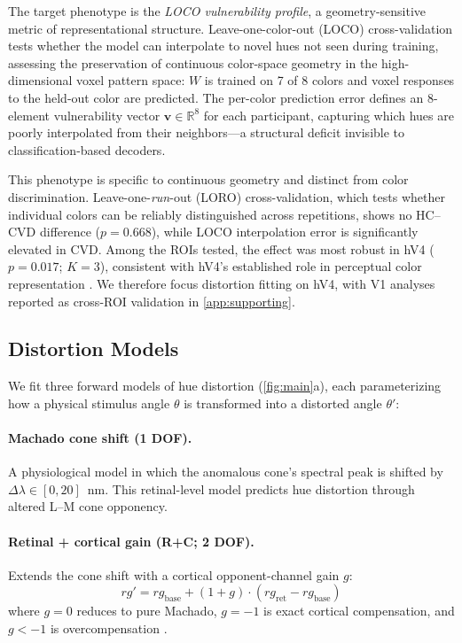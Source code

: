 \documentclass{article}
\begin{document}
The target phenotype is the \emph{LOCO vulnerability profile}, a geometry-sensitive metric of representational structure.
Leave-one-color-out (LOCO) cross-validation tests whether the model can interpolate to novel hues not seen during training, assessing the preservation of continuous color-space geometry in the high-dimensional voxel pattern space: $W$ is trained on 7 of 8 colors and voxel responses to the held-out color are predicted.
The per-color prediction error defines an 8-element vulnerability vector $\mathbf{v} \in \mathbb{R}^8$ for each participant, capturing which hues are poorly interpolated from their neighbors---a structural deficit invisible to classification-based decoders.

This phenotype is specific to continuous geometry and distinct from color discrimination.
Leave-one-\emph{run}-out (LORO) cross-validation, which tests whether individual colors can be reliably distinguished across repetitions, shows no HC--CVD difference ($p = 0.668$), while LOCO interpolation error is significantly elevated in CVD.
Among the ROIs tested, the effect was most robust in hV4 ($p = 0.017$; $K{=}3$), consistent with hV4's established role in perceptual color representation \cite{placeholder_brouwer2009, placeholder_bannert2018}.
We therefore focus distortion fitting on hV4, with V1 analyses reported as cross-ROI validation in \cref{app:supporting}.

\subsection{Distortion Models}

We fit three forward models of hue distortion (\cref{fig:main}a), each parameterizing how a physical stimulus angle $\theta$ is transformed into a distorted angle $\theta'$:

\paragraph{Machado cone shift (1 DOF).}
A physiological model \cite{placeholder_machado2009} in which the anomalous cone's spectral peak is shifted by $\Delta\lambda \in [0, 20]$~nm.
This retinal-level model predicts hue distortion through altered L--M cone opponency.

\paragraph{Retinal + cortical gain (R+C; 2 DOF).}
Extends the cone shift with a cortical opponent-channel gain $g$:
\begin{equation}
rg' = rg_{\text{base}} + (1{+}g) \cdot (rg_{\text{ret}} - rg_{\text{base}})
\label{eq:rc}
\end{equation}
where $g{=}0$ reduces to pure Machado, $g{=}{-}1$ is exact cortical compensation, and $g{<}{-}1$ is overcompensation \cite{placeholder_tregillus2021}.
\end{document}
